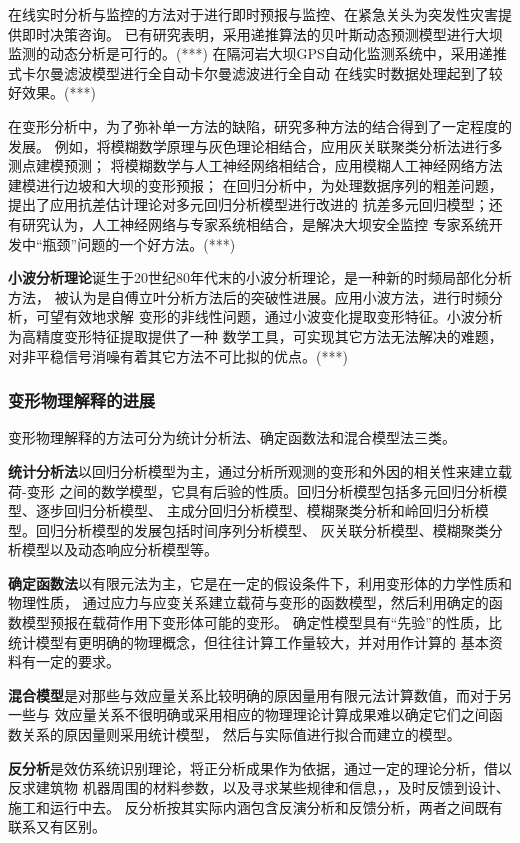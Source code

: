 在线实时分析与监控的方法对于进行即时预报与监控、在紧急关头为突发性灾害提供即时决策咨询。
已有研究表明，采用递推算法的贝叶斯动态预测模型进行大坝监测的动态分析是可行的。(***)
在隔河岩大坝GPS自动化监测系统中，采用递推式卡尔曼滤波模型进行全自动卡尔曼滤波进行全自动
在线实时数据处理起到了较好效果。(***)

在变形分析中，为了弥补单一方法的缺陷，研究多种方法的结合得到了一定程度的发展。
例如，将模糊数学原理与灰色理论相结合，应用灰关联聚类分析法进行多测点建模预测；
将模糊数学与人工神经网络相结合，应用模糊人工神经网络方法建模进行边坡和大坝的变形预报；
在回归分析中，为处理数据序列的粗差问题，提出了应用抗差估计理论对多元回归分析模型进行改进的
抗差多元回归模型；还有研究认为，人工神经网络与专家系统相结合，是解决大坝安全监控
专家系统开发中“瓶颈”问题的一个好方法。(***)

\textbf{小波分析理论}诞生于20世纪80年代末的小波分析理论，是一种新的时频局部化分析方法，
被认为是自傅立叶分析方法后的突破性进展。应用小波方法，进行时频分析，可望有效地求解
变形的非线性问题，通过小波变化提取变形特征。小波分析为高精度变形特征提取提供了一种
数学工具，可实现其它方法无法解决的难题，对非平稳信号消噪有着其它方法不可比拟的优点。(***)

\subsubsection*{变形物理解释的进展}
变形物理解释的方法可分为统计分析法、确定函数法和混合模型法三类。

\textbf{统计分析法}以回归分析模型为主，通过分析所观测的变形和外因的相关性来建立载荷-变形
之间的数学模型，它具有后验的性质。回归分析模型包括多元回归分析模型、逐步回归分析模型、
主成分回归分析模型、模糊聚类分析和岭回归分析模型。回归分析模型的发展包括时间序列分析模型、
灰关联分析模型、模糊聚类分析模型以及动态响应分析模型等。

\textbf{确定函数法}以有限元法为主，它是在一定的假设条件下，利用变形体的力学性质和物理性质，
通过应力与应变关系建立载荷与变形的函数模型，然后利用确定的函数模型预报在载荷作用下变形体可能的变形。
确定性模型具有“先验”的性质，比统计模型有更明确的物理概念，但往往计算工作量较大，并对用作计算的
基本资料有一定的要求。

\textbf{混合模型}是对那些与效应量关系比较明确的原因量用有限元法计算数值，而对于另一些与
效应量关系不很明确或采用相应的物理理论计算成果难以确定它们之间函数关系的原因量则采用统计模型，
然后与实际值进行拟合而建立的模型。

\textbf{反分析}是效仿系统识别理论，将正分析成果作为依据，通过一定的理论分析，借以反求建筑物
机器周围的材料参数，以及寻求某些规律和信息，，及时反馈到设计、施工和运行中去。
反分析按其实际内涵包含反演分析和反馈分析，两者之间既有联系又有区别。

